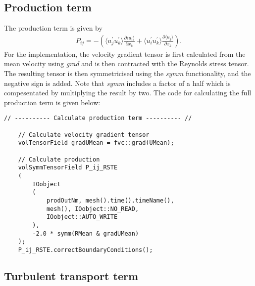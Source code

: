 \subsection{Production term}
\label{subsubsec:production_term}

The production term is given by
\begin{align}
    P_{ij} = - \left( \langle u^{\prime}_j u^{\prime}_k \rangle \frac{\partial \langle u_i \rangle}{\partial x_k} + \langle u^{\prime}_i u^{\prime}_k  \rangle \frac{\partial \langle u_j \rangle}{\partial x_k} \right) .
\end{align}
For the implementation, the velocity gradient tensor is first calculated from the mean velocity using \emph{grad} and is then contracted with the Reynolds stress tensor.
The resulting tensor is then symmetricised using the \emph{symm} functionality, and the negative sign is added.
Note that \emph{symm} includes a factor of a half which is compesentated by multiplying the result by two.
The \OF code for calculating the full production term is given below:

\begin{lstlisting}[emph={ddt,div,laplacian}]
    // ---------- Calculate production term ---------- //

    // Calculate velocity gradient tensor
    volTensorField gradUMean = fvc::grad(UMean);

    // Calculate production 
    volSymmTensorField P_ij_RSTE
    (
        IOobject
        (
            prodOutNm, mesh().time().timeName(),
            mesh(), IOobject::NO_READ,
            IOobject::AUTO_WRITE
        ),
        -2.0 * symm(RMean & gradUMean)
    );
    P_ij_RSTE.correctBoundaryConditions();
\end{lstlisting}

\subsection{Turbulent transport term}
\label{subsec:turbulent_transport}

